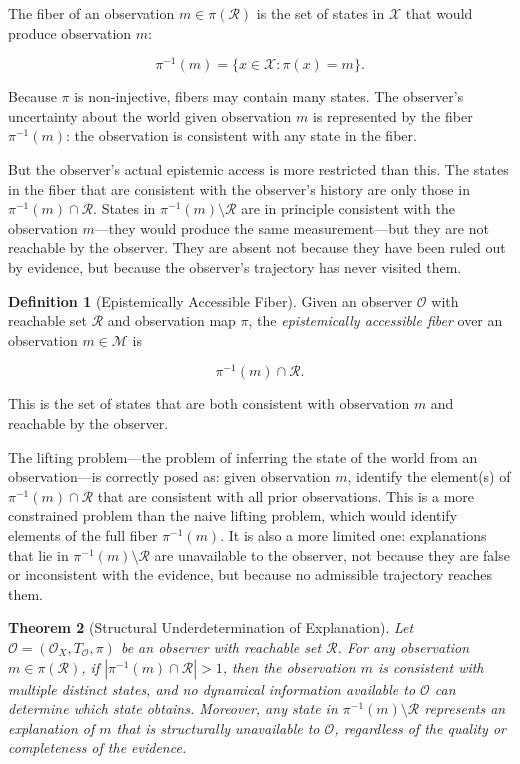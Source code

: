\documentclass[12pt, a4paper, oneside]{article}
\theoremstyle{plain}
\newtheorem{theorem}{Theorem}[section]
\theoremstyle{definition}
\newtheorem{definition}[theorem]{Definition}
\theoremstyle{remark}
\newcommand{\X}{\mathcal{X}}
\newcommand{\M}{\mathcal{M}}
\newcommand{\Obs}{\mathcal{O}}
\newcommand{\R}{\mathcal{R}}
\newcommand{\T}{T}
\newcommand{\proj}{\pi}
\begin{document}
The fiber of an observation $m \in \proj(\R)$ is the set of states in $\X$ that would produce observation $m$:

\begin{equation}
\proj^{-1}(m) = \{x \in \X : \proj(x) = m\}.
\end{equation}

Because $\proj$ is non-injective, fibers may contain many states. The observer's uncertainty about the world given observation $m$ is represented by the fiber $\proj^{-1}(m)$: the observation is consistent with any state in the fiber.

But the observer's actual epistemic access is more restricted than this. The states in the fiber that are consistent with the observer's history are only those in $\proj^{-1}(m) \cap \R$. States in $\proj^{-1}(m) \setminus \R$ are in principle consistent with the observation $m$---they would produce the same measurement---but they are not reachable by the observer. They are absent not because they have been ruled out by evidence, but because the observer's trajectory has never visited them.

\begin{definition}[Epistemically Accessible Fiber]
Given an observer $\Obs$ with reachable set $\R$ and observation map $\proj$, the \emph{epistemically accessible fiber} over an observation $m \in \M$ is

\begin{equation}
\proj^{-1}(m) \cap \R.
\end{equation}

This is the set of states that are both consistent with observation $m$ and reachable by the observer.
\end{definition}

The lifting problem---the problem of inferring the state of the world from an observation---is correctly posed as: given observation $m$, identify the element(s) of $\proj^{-1}(m) \cap \R$ that are consistent with all prior observations. This is a more constrained problem than the naive lifting problem, which would identify elements of the full fiber $\proj^{-1}(m)$. It is also a more limited one: explanations that lie in $\proj^{-1}(m) \setminus \R$ are unavailable to the observer, not because they are false or inconsistent with the evidence, but because no admissible trajectory reaches them.

\begin{theorem}[Structural Underdetermination of Explanation]
\label{thm:underdetermination}
Let $\Obs = (\Obs_X, \T_\Obs, \proj)$ be an observer with reachable set $\R$. For any observation $m \in \proj(\R)$, if $|\proj^{-1}(m) \cap \R| > 1$, then the observation $m$ is consistent with multiple distinct states, and no dynamical information available to $\Obs$ can determine which state obtains. Moreover, any state in $\proj^{-1}(m) \setminus \R$ represents an explanation of $m$ that is structurally unavailable to $\Obs$, regardless of the quality or completeness of the evidence.
\end{theorem}
\end{document}

